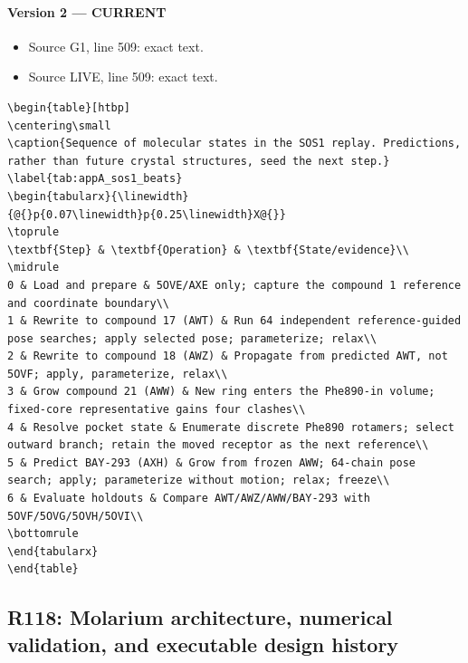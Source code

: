 \documentclass[11pt]{article}
\begin{document}
\paragraph{Version 2 --- CURRENT}

\begin{itemize}[leftmargin=*]
\item Source G1, line 509: exact text.
\item Source LIVE, line 509: exact text.
\end{itemize}

\begin{lstlisting}
\begin{table}[htbp]
\centering\small
\caption{Sequence of molecular states in the SOS1 replay. Predictions, rather than future crystal structures, seed the next step.}
\label{tab:appA_sos1_beats}
\begin{tabularx}{\linewidth}{@{}p{0.07\linewidth}p{0.25\linewidth}X@{}}
\toprule
\textbf{Step} & \textbf{Operation} & \textbf{State/evidence}\\
\midrule
0 & Load and prepare & 5OVE/AXE only; capture the compound 1 reference and coordinate boundary\\
1 & Rewrite to compound 17 (AWT) & Run 64 independent reference-guided pose searches; apply selected pose; parameterize; relax\\
2 & Rewrite to compound 18 (AWZ) & Propagate from predicted AWT, not 5OVF; apply, parameterize, relax\\
3 & Grow compound 21 (AWW) & New ring enters the Phe890-in volume; fixed-core representative gains four clashes\\
4 & Resolve pocket state & Enumerate discrete Phe890 rotamers; select outward branch; retain the moved receptor as the next reference\\
5 & Predict BAY-293 (AXH) & Grow from frozen AWW; 64-chain pose search; apply; parameterize without motion; relax; freeze\\
6 & Evaluate holdouts & Compare AWT/AWZ/AWW/BAY-293 with 5OVF/5OVG/5OVH/5OVI\\
\bottomrule
\end{tabularx}
\end{table}
\end{lstlisting}

\subsection{R118: Molarium architecture, numerical validation, and executable design history}
\end{document}
